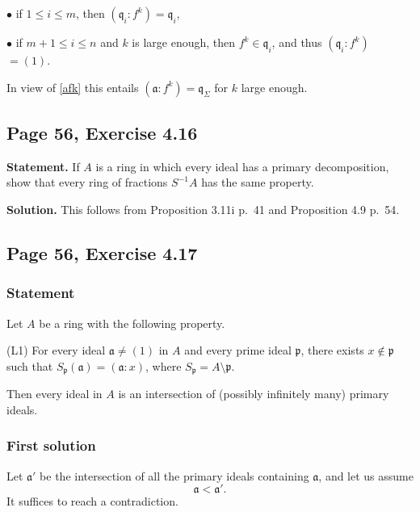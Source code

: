 \documentclass[parskip=half,fontsize=12pt]{scrartcl}%
\newcommand{\mf}{\mathfrak}
\newcommand{\aaa}{\mf a}
\newcommand{\qqq}{\mf q}
\newcommand{\bu}{\bullet}
\begin{document}
$\bu$ if $1\le i\le m$, then $(\qqq_i:f^k)=\qqq_i$,  

$\bu$ if $m+1\le i\le n$ and $k$ is large enough, then $f^k\in\qqq_i$, and thus $(\qqq_i:f^k)$ $=(1)$.

In view of \eqref{afk} this entails $(\aaa:f^k)=\qqq_\Sigma$ for $k$ large enough.

\subsection{Page 56, Exercise 4.16}%

\textbf{Statement.} If $A$ is a ring in which every ideal has a primary decomposition, show that every ring of fractions $S^{-1}A$ has the same property.

\textbf{Solution.} This follows from Proposition 3.11i p.~41 and Proposition 4.9 p.~54.

\subsection{Page 56, Exercise 4.17}%

\subsubsection{Statement}\label{417}%

Let $A$ be a ring with the following property.

(L1) For every ideal $\mathfrak a\ne(1)$ in $A$ and every prime ideal $\mathfrak p$, there exists $x\notin\mathfrak p$ such that $S_{\mathfrak p}(\mathfrak a)=(\mathfrak a:x)$, where $S_{\mathfrak p}=A\setminus\mathfrak p$.

Then every ideal in $A$ is an intersection of (possibly infinitely many) primary ideals.

\subsubsection{First solution}%

Let $\aaa'$ be the intersection of all the primary ideals containing $\aaa$, and let us assume  
\begin{equation}\label{abs417}
\aaa<\aaa'.
\end{equation} 
It suffices to reach a contradiction.
\end{document}
